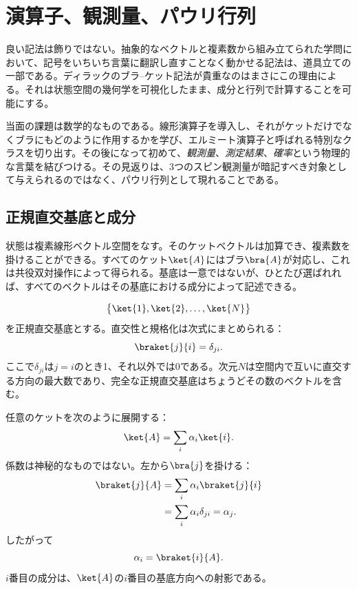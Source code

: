 \chapter{演算子、観測量、パウリ行列}

良い記法は飾りではない。抽象的なベクトルと複素数から組み立てられた学問において、記号をいちいち言葉に翻訳し直すことなく動かせる記法は、道具立ての一部である。ディラックのブラ--ケット記法が貴重なのはまさにこの理由による。それは状態空間の幾何学を可視化したまま、成分と行列で計算することを可能にする。

当面の課題は数学的なものである。線形演算子を導入し、それがケットだけでなくブラにもどのように作用するかを学び、エルミート演算子と呼ばれる特別なクラスを切り出す。その後になって初めて、\emph{観測量}、\emph{測定結果}、\emph{確率}という物理的な言葉を結びつける。その見返りは、3つのスピン観測量が暗記すべき対象として与えられるのではなく、パウリ行列として現れることである。

\section{正規直交基底と成分}

状態は複素線形ベクトル空間をなす。そのケットベクトルは加算でき、複素数を掛けることができる。すべてのケット\(\ket{A}\)にはブラ\(\bra{A}\)が対応し、これは共役双対操作によって得られる。基底は一意ではないが、ひとたび選ばれれば、すべてのベクトルはその基底における成分によって記述できる。

\[
\bigl\{\ket{1},\ket{2},\ldots,\ket{N}\bigr\}
\]を正規直交基底とする。直交性と規格化は次式にまとめられる：
\begin{equation}
\braket{j}{i}=\delta_{ji}.
\label{eq:orthonormal-basis}
\end{equation}
ここで\(\delta_{ji}\)は\(j=i\)のとき1、それ以外では0である。次元\(N\)は空間内で互いに直交する方向の最大数であり、完全な正規直交基底はちょうどその数のベクトルを含む。

任意のケットを次のように展開する：
\begin{equation}
\ket{A}=\sum_i \alpha_i\ket{i}.
\label{eq:ket-expansion}
\end{equation}
係数は神秘的なものではない。左から\(\bra{j}\)を掛ける：
\begin{align}
\braket{j}{A}
 &=\sum_i\alpha_i\braket{j}{i} \\
 &=\sum_i\alpha_i\delta_{ji}
 =\alpha_j.
\end{align}
したがって
\begin{equation}
\alpha_i=\braket{i}{A}.
\label{eq:components-inner-products}
\end{equation}
\(i\)番目の成分は、\(\ket{A}\)の\(i\)番目の基底方向への射影である。

